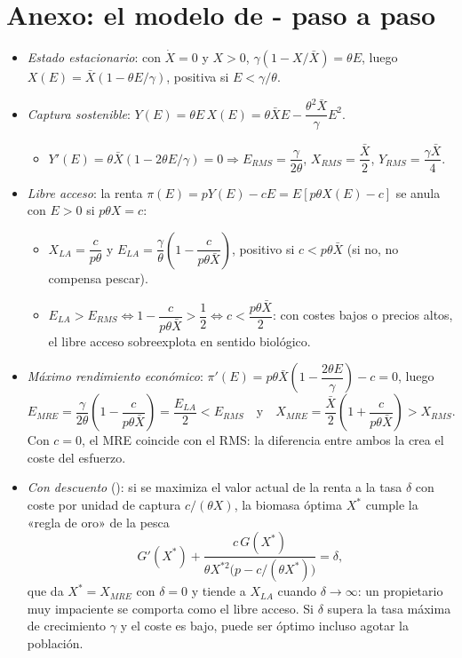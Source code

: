 \documentclass[11pt]{article}
\begin{document}
\section{Anexo: el modelo de -\cortetitulo{} paso a paso}\label{anexo:gordon}

\begin{itemize}
\item \emph{Estado estacionario}: con $\dot X=0$ y $X>0$, $\gamma\left(1-X/\bar X\right)=\theta E$, luego $X(E)=\bar X\left(1-\theta E/\gamma\right)$, positiva si $E<\gamma/\theta$.
\item \emph{Captura sostenible}: $Y(E)=\theta E\,X(E)=\theta\bar X E-\dfrac{\theta^2\bar X}{\gamma}E^2$.
  \begin{itemize}
  \item $Y'(E)=\theta\bar X\left(1-2\theta E/\gamma\right)=0\Rightarrow E_{\mathit{RMS}}=\dfrac{\gamma}{2\theta}$, $X_{\mathit{RMS}}=\dfrac{\bar X}{2}$, $Y_{\mathit{RMS}}=\dfrac{\gamma\bar X}{4}$.
  \end{itemize}
\item \emph{Libre acceso}: la renta $\pi(E)=pY(E)-cE=E\left[p\theta X(E)-c\right]$ se anula con $E>0$ si $p\theta X=c$:
  \begin{itemize}
  \item $X_{\mathit{LA}}=\dfrac{c}{p\theta}$ y $E_{\mathit{LA}}=\dfrac{\gamma}{\theta}\left(1-\dfrac{c}{p\theta\bar X}\right)$, positivo si $c<p\theta\bar X$ (si no, no compensa pescar).
  \item $E_{\mathit{LA}}>E_{\mathit{RMS}}\iff 1-\dfrac{c}{p\theta\bar X}>\dfrac12\iff c<\dfrac{p\theta\bar X}{2}$: con costes bajos o precios altos, el libre acceso sobreexplota en sentido biológico.
  \end{itemize}
\item \emph{Máximo rendimiento económico}: $\pi'(E)=p\theta\bar X\left(1-\dfrac{2\theta E}{\gamma}\right)-c=0$, luego
  \[E_{\mathit{MRE}}=\frac{\gamma}{2\theta}\left(1-\frac{c}{p\theta\bar X}\right)=\frac{E_{\mathit{LA}}}{2}<E_{\mathit{RMS}}\quad\text{y}\quad X_{\mathit{MRE}}=\frac{\bar X}{2}\left(1+\frac{c}{p\theta\bar X}\right)>X_{\mathit{RMS}}.\]
  Con $c=0$, el MRE coincide con el RMS: la diferencia entre ambos la crea el coste del esfuerzo.\findemo
\item \emph{Con descuento} (\textcite{Clark1990}): si se maximiza el valor actual de la renta a la tasa $\delta$ con coste por unidad de captura $c/(\theta X)$, la biomasa óptima $X^*$ cumple la «regla de oro» de la pesca
  \[G'(X^*)+\frac{c\,G(X^*)}{\theta X^{*2}\big(p-c/(\theta X^*)\big)}=\delta,\]
  que da $X^*=X_{\mathit{MRE}}$ con $\delta=0$ y tiende a $X_{\mathit{LA}}$ cuando $\delta\to\infty$: un propietario muy impaciente se comporta como el libre acceso. Si $\delta$ supera la tasa máxima de crecimiento $\gamma$ y el coste es bajo, puede ser óptimo incluso agotar la población.
\end{itemize}
\end{document}
